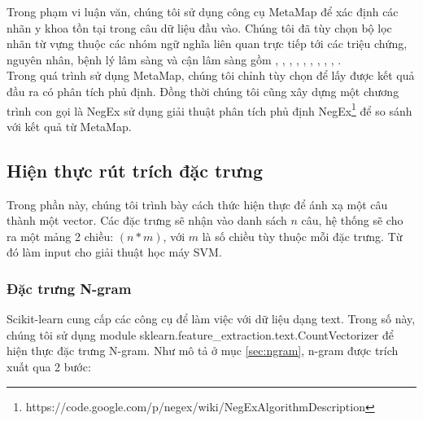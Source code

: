 Trong phạm vi luận văn, chúng tôi sử dụng công cụ MetaMap để xác định các nhãn y khoa tồn tại trong câu dữ liệu đầu vào. Chúng tôi đã tùy chọn bộ lọc nhãn từ vựng thuộc các nhóm ngữ nghĩa liên quan trực tiếp tới các triệu chứng, nguyên nhân, bệnh lý lâm sàng và cận lâm sàng gồm , , , , , , , , , .\\

Trong quá trình sử dụng MetaMap, chúng tôi chỉnh tùy chọn  để lấy được kết quả đầu ra có phân tích phủ định. Đồng thời chúng tôi cũng xây dựng một chương trình con gọi là NegEx sử dụng giải thuật phân tích phủ định NegEx\footnote{https://code.google.com/p/negex/wiki/NegExAlgorithmDescription} để so sánh với kết quả từ MetaMap.

\subsection{Hiện thực rút trích đặc trưng}
Trong phần này, chúng tôi trình bày cách thức hiện thực để ánh xạ một câu thành một vector. Các đặc trưng sẽ nhận vào danh sách $n$ câu, hệ thống sẽ cho ra một mảng 2 chiều: $(n*m)$, với $m$ là số chiều tùy thuộc mỗi đặc trưng. Từ đó làm input cho giải thuật học máy SVM.
\subsubsection*{Đặc trưng N-gram}
Scikit-learn cung cấp các công cụ để làm việc với dữ liệu dạng text. Trong số này, chúng tôi sử dụng module sklearn.feature\_extraction.text.CountVectorizer để hiện thực đặc trưng N-gram. Như mô tả ở mục \ref{sec:ngram}, n-gram được trích xuất qua 2 bước:\\

